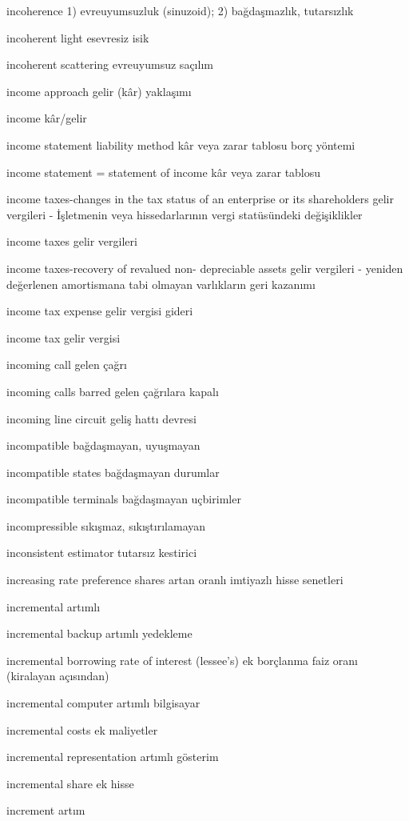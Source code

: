 \documentclass[12pt,fleqn]{article}\usepackage{../../common}
\begin{document}
incoherence 1) evreuyumsuzluk (sinuzoid); 2) bağdaşmazlık, tutarsızlık

incoherent light esevresiz isik

incoherent scattering evreuyumsuz saçılım

income approach gelir (kâr) yaklaşımı

income kâr/gelir

income statement liability method kâr veya zarar tablosu borç yöntemi

income statement = statement of income kâr veya zarar tablosu

income taxes-changes in the tax status of an enterprise or its shareholders gelir vergileri - İşletmenin veya hissedarlarının vergi statüsündeki değişiklikler

income taxes gelir vergileri

income taxes-recovery of revalued non- depreciable assets gelir vergileri - yeniden değerlenen amortismana tabi olmayan varlıkların geri kazanımı

income tax expense gelir vergisi gideri

income tax gelir vergisi

incoming call gelen çağrı

incoming calls barred gelen çağrılara kapalı

incoming line circuit geliş hattı devresi

incompatible bağdaşmayan, uyuşmayan

incompatible states bağdaşmayan durumlar

incompatible terminals bağdaşmayan uçbirimler

incompressible sıkışmaz, sıkıştırılamayan

inconsistent estimator tutarsız kestirici

increasing rate preference shares artan oranlı imtiyazlı hisse senetleri

incremental artımlı

incremental backup artımlı yedekleme

incremental borrowing rate of interest (lessee's) ek borçlanma faiz oranı (kiralayan açısından)

incremental computer artımlı bilgisayar

incremental costs ek maliyetler

incremental representation artımlı gösterim

incremental share ek hisse

increment artım
\end{document}
